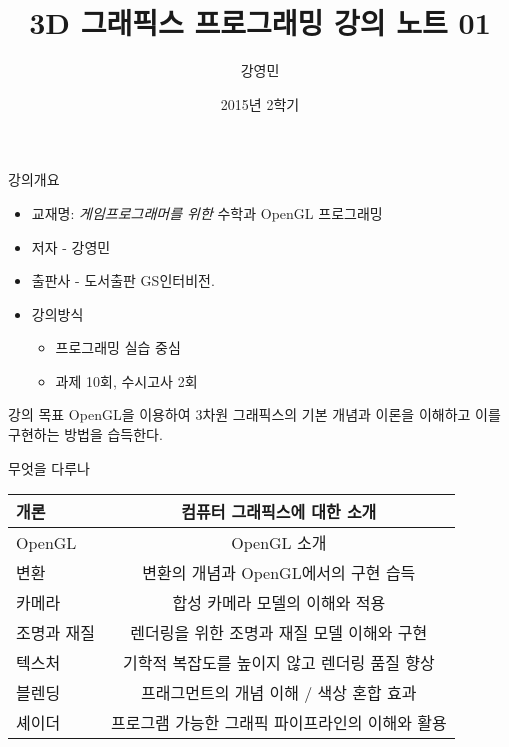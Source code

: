 \documentclass{beamer}
\title[3D 그래픽스 프로그래밍]{3D 그래픽스 프로그래밍 강의 노트 01}
\author{강영민}
\institute{동명대학교}
\date{2015년 2학기}
\begin{document}
\begin{frame}
  \titlepage
\end{frame}



\begin{frame}{강의개요}
\begin{itemize}
  \item 교재명: {\small \it 게임프로그래머를 위한} 수학과 OpenGL 프로그래밍
  \item 저자 - 강영민
  \item 출판사 -  도서출판 GS인터비전.
  \item 강의방식
    \begin{itemize}
      \item 프로그래밍 실습 중심 
      \item 과제 10회, 수시고사 2회
    \end{itemize} 
\end{itemize}

\begin{block}{강의 목표}
OpenGL을 이용하여 3차원 그래픽스의 기본 개념과 이론을 이해하고 이를 구현하는 방법을 습득한다.
\end{block}

\end{frame}


\begin{frame}{무엇을 다루나}


\begin{table}
\centering
\begin{tabular}{l|c}  \hline
개론 & 컴퓨터 그래픽스에 대한 소개 \\\hline  \hline
OpenGL & OpenGL 소개 \\ \hline
변환 & 변환의 개념과 OpenGL에서의 구현 습득 \\ \hline
카메라 & 합성 카메라 모델의 이해와 적용\\ \hline
조명과 재질 & 렌더링을 위한 조명과 재질 모델 이해와 구현 \\ \hline
텍스처 & 기학적 복잡도를 높이지 않고 렌더링 품질 향상 \\ \hline
블렌딩 & 프래그먼트의 개념 이해 / 색상 혼합 효과 \\ \hline
셰이더 & 프로그램 가능한 그래픽 파이프라인의 이해와 활용 \\ \hline
\end{tabular}
\end{table}

\end{frame}
\end{document}
